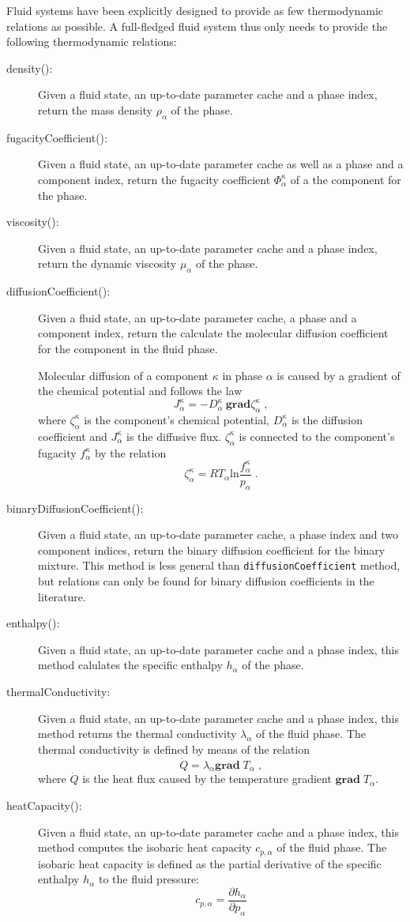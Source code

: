 Fluid systems have been explicitly designed to provide as few
thermodynamic relations as possible. A full-fledged fluid system thus
only needs to provide the following thermodynamic relations:
\begin{description}
\item[density():] Given a fluid state, an up-to-date parameter cache
  and a phase index, return the mass density $\rho_\alpha$ of the
  phase.
\item[fugacityCoefficient():] Given a fluid state, an up-to-date
  parameter cache as well as a phase and a component index, return the
  fugacity coefficient $\Phi^\kappa_\alpha$ of a the component for the
  phase.
\item[viscosity():] Given a fluid state, an up-to-date parameter cache
  and a phase index, return the dynamic viscosity $\mu_\alpha$ of the
  phase.
\item[diffusionCoefficient():] Given a fluid state, an up-to-date
  parameter cache, a phase and a component index, return the calculate
  the molecular diffusion coefficient for the component in the fluid
  phase.

  Molecular diffusion of a component $\kappa$ in phase $\alpha$ is
  caused by a gradient of the chemical potential and follows the law
  \[
  J^\kappa_\alpha = - D^\kappa_\alpha\ \mathbf{grad} \zeta^\kappa_\alpha\;,
  \]
  where $\zeta^\kappa_\alpha$ is the component's chemical potential,
  $D^\kappa_\alpha$ is the diffusion coefficient and $J^\kappa_\alpha$
  is the diffusive flux. $\zeta^\kappa_\alpha$ is connected to the
  component's fugacity $f^\kappa_\alpha$ by the relation
  \[
  \zeta^\kappa_\alpha =
  R T_\alpha \mathrm{ln} \frac{f^\kappa_\alpha}{p_\alpha} \;.
  \]
\item[binaryDiffusionCoefficient():] Given a fluid state, an
  up-to-date parameter cache, a phase index and two component indices,
  return the binary diffusion coefficient for the binary mixture. This
  method is less general than \texttt{diffusionCoefficient} method,
  but relations can only be found for binary diffusion coefficients in
  the literature.
\item[enthalpy():] Given a fluid state, an up-to-date parameter cache
  and a phase index, this method calulates the specific enthalpy
  $h_\alpha$ of the phase.
\item[thermalConductivity:] Given a fluid state, an up-to-date
  parameter cache and a phase index, this method returns the thermal
  conductivity $\lambda_\alpha$ of the fluid phase. The thermal
  conductivity is defined by means of the relation
  \[
  \dot Q = \lambda_\alpha \mathbf{grad}\;T_\alpha \;,
  \]
  where $\dot Q$ is the heat flux caused by the temperature gradient
  $\mathbf{grad}\;T_\alpha$.
\item[heatCapacity():] Given a fluid state, an up-to-date parameter
  cache and a phase index, this method computes the isobaric heat
  capacity $c_{p,\alpha}$ of the fluid phase. The isobaric heat
  capacity is defined as the partial derivative of the specific
  enthalpy $h_\alpha$ to the fluid pressure:
  \[
  c_{p,\alpha} = \frac{\partial h_\alpha}{\partial p_\alpha}
  \]
\end{description}

